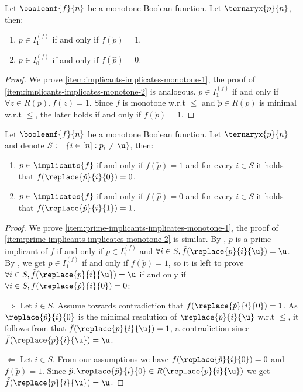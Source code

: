 \documentclass[acmsmall, nonacm, authorversion]{acmart}
\begin{document}
\begin{lemma}\label{lem:implicants-implicates-monotone}
Let $\booleanf{f}{n}$ be a monotone Boolean function. Let $\ternaryx{p}{n}$, then:
\begin{enumerate}
    \item $p\in I_1^{(f)}$ if and only if $f(\check{p})=1$.\label{item:implicants-implicates-monotone-1}
    \item $p\in I_0^{(f)}$ if and only if $f(\hat{p})=0$.\label{item:implicants-implicates-monotone-2}
\end{enumerate}
\end{lemma}
\begin{proof}
We prove \eqref{item:implicants-implicates-monotone-1}, the proof of \eqref{item:implicants-implicates-monotone-2} is analogous. $p\in I_{1}^{(f)}$ if and only if $\forall z\in R(p), f(z)=1$. Since $f$ is monotone w.r.t $\le$ and $\check{p}\in R(p)$ is minimal w.r.t $\le$, the later holds if and only if $f(\check{p})=1$. 
\end{proof}

\begin{lemma}\label{lem:prime-implicants-implicates-monotone}
Let $\booleanf{f}{n}$ be a monotone Boolean function. Let $\ternaryx{p}{n}$ and denote $S:=\{i\in [n]: p_i\neq \u\}$, then:
\begin{enumerate}
    \item $p \in \implicants{f}$ if and only if $f(\check{p})=1$ and for every $i\in S$ it holds that $f(\replace{\check{p}}{i}{0})=0$.\label{item:prime-implicants-implicates-monotone-1}
    \item $p \in \implicates{f}$ if and only if $f(\hat{p})=0$ and for every $i\in S$ it holds that $f(\replace{\hat{p}}{i}{1})=1$.\label{item:prime-implicants-implicates-monotone-2}
\end{enumerate}
\end{lemma}
\begin{proof}
We prove \eqref{item:prime-implicants-implicates-monotone-1}, the proof of \eqref{item:prime-implicants-implicates-monotone-2} is similar. By , $p$ is a prime implicant of $f$ if and only if $p\in I_1^{(f)}$ and $\forall i\in S, \tilde{f}(\replace{p}{i}{\u})=\u$. By , we get $p\in I_1^{(f)}$ if and only if $f(\check{p})=1$, so it is left to prove $\forall i\in S, \tilde{f}(\replace{p}{i}{\u})=\u$ if and only if $\forall i\in S, f(\replace{\check{p}}{i}{0})=0$:

$\Rightarrow$ Let $i\in S$. Assume towards contradiction that $f(\replace{\check{p}}{i}{0})=1$. As $\replace{\check{p}}{i}{0}$ is the minimal resolution of $\replace{p}{i}{\u}$ w.r.t $\le$, it follows from 
 that $\tilde{f}(\replace{p}{i}{\u})=1$, a contradiction since $\tilde{f}(\replace{p}{i}{\u})=\u$.

$\Leftarrow$ Let $i\in S$. From our assumptions we have $f(\replace{\check{p}}{i}{0})=0$ and $f(\check{p})=1$. Since $\check{p}, \replace{\check{p}}{i}{0}\in R(\replace{p}{i}{\u})$ we get $\tilde{f}(\replace{p}{i}{\u})=\u$.
\end{proof}
\end{document}
